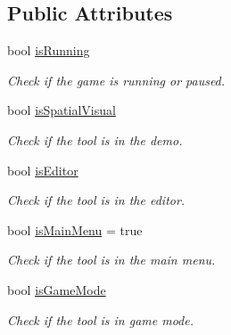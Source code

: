 \subsection*{Public Attributes}
\begin{DoxyCompactItemize}
\item 
\mbox{\label{class_tool_acbf777592bae41cf7a6ebcb9f03fbcef}} 
bool \mbox{\hyperlink{class_tool_acbf777592bae41cf7a6ebcb9f03fbcef}{is\+Running}}
\begin{DoxyCompactList}\small\item\em Check if the game is running or paused. \end{DoxyCompactList}\item 
\mbox{\label{class_tool_a04dc76bc01dc69bb621c43d581c36fbc}} 
bool \mbox{\hyperlink{class_tool_a04dc76bc01dc69bb621c43d581c36fbc}{is\+Spatial\+Visual}}
\begin{DoxyCompactList}\small\item\em Check if the tool is in the demo. \end{DoxyCompactList}\item 
\mbox{\label{class_tool_abce4d9f93f923acb15f1aab0bd665822}} 
bool \mbox{\hyperlink{class_tool_abce4d9f93f923acb15f1aab0bd665822}{is\+Editor}}
\begin{DoxyCompactList}\small\item\em Check if the tool is in the editor. \end{DoxyCompactList}\item 
\mbox{\label{class_tool_a7915b46d6b11dc4d24f2399775c9e91d}} 
bool \mbox{\hyperlink{class_tool_a7915b46d6b11dc4d24f2399775c9e91d}{is\+Main\+Menu}} = true
\begin{DoxyCompactList}\small\item\em Check if the tool is in the main menu. \end{DoxyCompactList}\item 
\mbox{\label{class_tool_a2bb2b23f192da67b340cf869a973b106}} 
bool \mbox{\hyperlink{class_tool_a2bb2b23f192da67b340cf869a973b106}{is\+Game\+Mode}}
\begin{DoxyCompactList}\small\item\em Check if the tool is in game mode. \end{DoxyCompactList}\item 

\end{DoxyCompactItemize}

